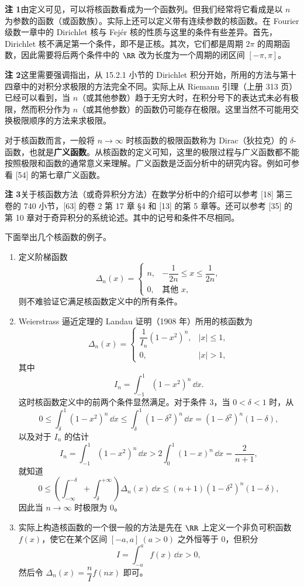 \begin{xremark}
\textbf{注 1}\quad 由定义可见，可以将核函数看成为一个函数列。但我们经常将它看成是以 $n$ 为参数的函数（或函数族）。实际上还可以定义带有连续参数的核函数。在 Fourier 级数一章中的 Dirichlet 核与 Fejér 核的性质与这里的条件有些差异。首先，Dirichlet 核不满足第一个条件，即不是正核。其次，它们都是周期 $2\pi$ 的周期函数，因此需要将后两个条件中的 $\RR$ 改为长度为一个周期的闭区间 $[-\pi,\pi]$。

\textbf{注 2}\quad 这里需要强调指出，从 15.2.1 小节的 Dirichlet 积分开始，所用的方法与第十四章中的对积分求极限的方法完全不同。实际上从 Riemann 引理（上册 313 页）已经可以看到，当 $n$（或其他参数）趋于无穷大时，在积分号下的表达式未必有极限，然而积分作为 $n$（或其他参数）的函数仍可能存在极限。这里当然不可能用交换极限顺序的方法来求极限。
\end{xremark}

对于核函数而言，一般将 $n\to\infty$ 时核函数的极限函数称为 Dirac（狄拉克）的 $\delta$-函数，也就是\textbf{广义函数}。从核函数的定义可知，这里的极限过程与广义函数都不能按照极限和函数的通常意义来理解。广义函数是泛函分析中的研究内容。例如可参看 [54] 的第七章广义函数。

\begin{xremark}
\textbf{注 3}\quad 关于核函数方法（或奇异积分方法）在数学分析中的介绍可以参考 [18] 第三卷的 740 小节，[63] 的卷 2 第 17 章 §4 和 [13] 的第 5 章等。还可以参考 [35] 的第 10 章对于奇异积分的系统论述。其中的记号和条件不尽相同。
\end{xremark}

下面举出几个核函数的例子。

\begin{enumerate}[label=\arabic*.]
\item 定义阶梯函数
\[
  \Delta_n(x)=
  \begin{cases}
    n,&-\dfrac1{2n}\leqslant x\leqslant\dfrac1{2n},\\
    0,&\text{其他 }x,
  \end{cases}
\]
则不难验证它满足核函数定义中的所有条件。

\item Weierstrass 逼近定理的 Landau 证明（1908 年）所用的核函数为
\[
  \Delta_n(x)=
  \begin{cases}
    \dfrac1{I_n}(1-x^2)^n,&|x|\leqslant1,\\
    0,&|x|>1,
  \end{cases}
\]
其中
\[
  I_n=\int_{-1}^1(1-x^2)^n\,\dd x.
\]
这时核函数定义中的前两个条件显然满足。对于条件 3，当 $0<\delta<1$ 时，从
\[
  0\leqslant\int_\delta^1(1-x^2)^n\,\dd x
  \leqslant\int_\delta^1(1-\delta^2)^n\,\dd x
  =(1-\delta^2)^n(1-\delta),
\]
以及对于 $I_n$ 的估计
\[
  I_n=\int_{-1}^1(1-x^2)^n\,\dd x
  >2\int_0^1(1-x)^n\,\dd x=\frac2{n+1},
\]
就知道
\[
  0\leqslant\left(\int_{-\infty}^{-\delta}+\int_\delta^{+\infty}\right)
  \Delta_n(x)\,\dd x
  \leqslant(n+1)(1-\delta^2)^n(1-\delta),
\]
因此当 $n\to\infty$ 时极限为 0。

\item 实际上构造核函数的一个很一般的方法是先在 $\RR$ 上定义一个非负可积函数 $f(x)$，使它在某个区间 $[-a,a]\ (a>0)$ 之外恒等于 0，但积分
\[
  I=\int_{-a}^a f(x)\,\dd x>0,
\]
然后令 $\Delta_n(x)=\dfrac nI f(nx)$ 即可。
\end{enumerate}

